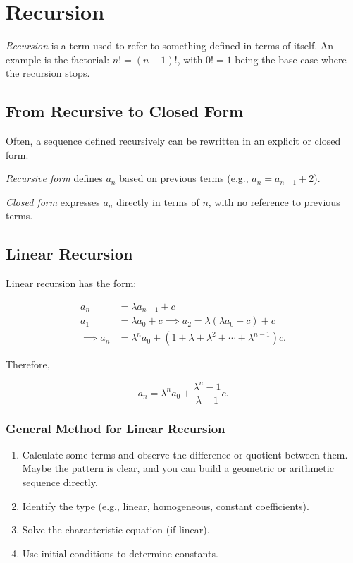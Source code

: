 \chapter{Recursion}

\emph{Recursion} is a term used to refer to something defined in terms
of itself. An example is the factorial: \(n! = (n - 1)!\), with \(0! = 1\) being the
base case where the recursion stops.

\section{From Recursive to Closed Form}

Often, a sequence defined recursively can be rewritten in an explicit or closed form.

\emph{Recursive form} defines \( a_n \) based on previous terms (e.g., \( a_n = a_{n-1} + 2 \)).

\emph{Closed form} expresses \( a_n \) directly in terms of \(n\), with no reference to previous terms.

\section{Linear Recursion}

Linear recursion has the form:

\begin{align*}
    a_n & = \lambda a_{n -1} + c \\
    a_1 & = \lambda a_0 + c \implies a_2 = \lambda (\lambda a_0 + c) + c \\
    \implies a_n & = \lambda^n a_0 + (1 + \lambda + \lambda^2 + \cdots + \lambda^{n - 1})c.
\end{align*}

Therefore,

\[
    a_n = \lambda^n a_0 + \frac{\lambda^n - 1}{\lambda - 1}c.
\]

\subsection{General Method for Linear Recursion}

\begin{enumerate}

    \item Calculate some terms and observe the difference or quotient between them.
    Maybe the pattern is clear, and you can build a geometric or arithmetic sequence directly.

    \item Identify the type (e.g., linear, homogeneous, constant coefficients).

    \item Solve the characteristic equation (if linear).

    \item Use initial conditions to determine constants.

\end{enumerate}


